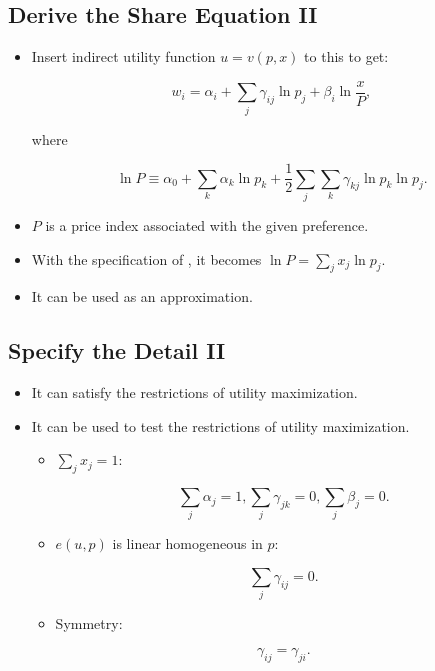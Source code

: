 \documentclass[]{book}
\providecommand{\tightlist}{%
  \setlength{\itemsep}{0pt}\setlength{\parskip}{0pt}}
\begin{document}
\subsection{Derive the Share Equation
II}\label{derive-the-share-equation-ii}

\begin{itemize}
\tightlist
\item
  Insert indirect utility function \(u = v(p, x)\) to this to get:

  \begin{equation}
  w_i = \alpha_i + \sum_{j} \gamma_{ij} \ln p_j + \beta_i \ln \frac{x}{P},
  \end{equation}

  where

  \begin{equation}
  \ln P \equiv  \alpha_0 + \sum_{k} \alpha_k \ln p_k + \frac{1}{2} \sum_{j} \sum_{k} \gamma_{kj} \ln p_k \ln p_j.
  \end{equation}
\item
  \(P\) is a price index associated with the given preference.
\item
  With the specification of \citet{RichardStone1954}, it becomes
  \(\ln P = \sum_{j} x_j \ln p_j\).
\item
  It can be used as an approximation.
\end{itemize}

\subsection{Specify the Detail II}\label{specify-the-detail-ii}

\begin{itemize}
\tightlist
\item
  It can satisfy the restrictions of utility maximization.
\item
  It can be used to test the restrictions of utility maximization.

  \begin{itemize}
  \tightlist
  \item
    \(\sum_{j} x_j = 1\):

    \begin{equation}
    \sum_{j} \alpha_j = 1, \sum_{j} \gamma_{jk} = 0, \sum_{j} \beta_j = 0.
    \end{equation}
  \item
    \(e(u, p)\) is linear homogeneous in \(p\):

    \begin{equation}
    \sum_{j} \gamma_{ij} = 0.
    \end{equation}
  \item
    Symmetry:

    \begin{equation}
    \gamma_{ij} = \gamma_{ji}.
    \end{equation}
  \end{itemize}
\end{itemize}
\end{document}
